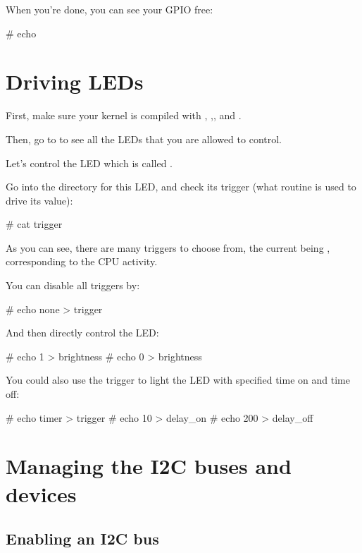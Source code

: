 When you're done, you can see your GPIO free:

\begin{bashinput}
# echo %
\end{bashinput}

\section{Driving LEDs}

First, make sure your kernel is compiled with
, 
,, 
and .

Then, go to  to see all the LEDs that you are allowed
to control.

Let's control the LED which is called
.

Go into the directory for this LED, and check its trigger (what
routine is used to drive its value):

\begin{bashinput}
# cat trigger
\end{bashinput}

As you can see, there are many triggers to choose from, the current
being , corresponding to the CPU activity.

You can disable all triggers by:

\begin{bashinput}
# echo none > trigger
\end{bashinput}

And then directly control the LED:

\begin{bashinput}
# echo 1 > brightness
# echo 0 > brightness
\end{bashinput}

You could also use the  trigger to light the LED
with specified time on and time off:

\begin{bashinput}
# echo timer > trigger
# echo 10 > delay_on
# echo 200 > delay_off
\end{bashinput}
\section{Managing the I2C buses and devices}

\subsection{Enabling an I2C bus}

